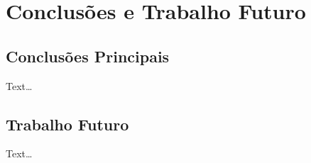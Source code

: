 \chapter{Conclusões e Trabalho Futuro}
\label{ch::conclusao}

\section{Conclusões Principais}
\label{sec::conclusao:principal}

Text\ldots


\section{Trabalho Futuro}
\label{sec::conclusao:futuro}

Text\ldots
